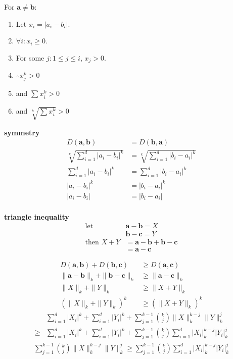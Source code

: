 \documentclass{IEEEtran}
\begin{document}
For \(\mathbf{a} \ne \mathbf{b}\):
\begin{enumerate}
    \item Let \(x_i = \left|a_i - b_i\right|\).
    \item \(\forall i: x_i \ge 0\).
    \item For some \(j : 1 \le j \le i\), \(x_j > 0\).
    \item \(\therefore x_j^k > 0\)
    \item and \(\sum x_i^k > 0\)
    \item and \(\sqrt[k]{\sum x_i^k} > 0\)
\end{enumerate}

\textbf{symmetry} %
\begin{align*}
    D(\mathbf{a}, \mathbf{b}) &= D(\mathbf{b}, \mathbf{a}) \\
    \sqrt[k]{\sum_{i=1}^d\left|a_i - b_i\right|^k} &= \sqrt[k]{\sum_{i=1}^d\left|b_i - a_i\right|^k} \\
    \sum_{i=1}^d\left|a_i - b_i\right|^k &= \sum_{i=1}^d\left|b_i - a_i\right|^k \\
    \left|a_i - b_i\right|^k &= \left|b_i - a_i\right|^k \\
    \left|a_i - b_i\right| &= \left|b_i - a_i\right| \\
\end{align*}

\textbf{triangle inequality} %
\begin{align*}
    \text{let } & \mathbf{a} - \mathbf{b} = X \\
    & \mathbf{b} - \mathbf{c} = Y \\
    \text{then } X + Y &= \mathbf{a} - \mathbf{b} + \mathbf{b} - \mathbf{c} \\
    &= \mathbf{a} - \mathbf{c}
\end{align*}

\begin{align*}
    D(\mathbf{a}, \mathbf{b}) + D(\mathbf{b}, \mathbf{c}) &\ge D(\mathbf{a}, \mathbf{c}) \\
    \|\mathbf{a} - \mathbf{b}\|_k + \|\mathbf{b} - \mathbf{c}\|_k &\ge \|\mathbf{a} - \mathbf{c}\|_k \\
    \|X\|_k + \|Y\|_k &\ge \|X + Y\|_k \\
    \left(\|X\|_k + \|Y\|_k\right)^k &\ge \left(\|X + Y\|_k\right)^k
\end{align*}
\begin{align*}
    & \sum_{i=1}^d \left|X_i\right|^k + \sum_{i=1}^d \left|Y_i\right|^k + \sum_{j=1}^{k-1}\binom{k}{j} \|X\|_k^{k-j} \|Y\|_k^j \\
    \ge & \sum_{i=1}^d \left|X_i\right|^k + \sum_{i=1}^d \left|Y_i\right|^k +
    \sum_{j=1}^{k-1}\binom{k}{j} \sum_{i=1}^d \left|X_i\right|_k^{k-j} \left|Y_i\right|_k^j
\end{align*}
\begin{align*}
    \sum_{j=1}^{k-1}\binom{k}{j} \|X\|_k^{k-j} \|Y\|_k^j \ge \sum_{j=1}^{k-1}\binom{k}{j}
    \sum_{i=1}^d \left|X_i\right|_k^{k-j} \left|Y_i\right|_k^j
\end{align*}
\end{document}
